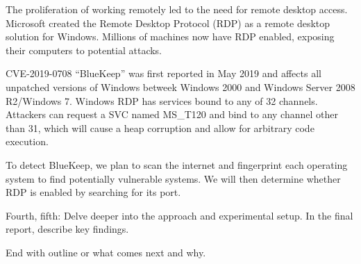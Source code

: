 The proliferation of working remotely led to the need for remote desktop
access. Microsoft created the Remote Desktop Protocol (RDP) as a remote
desktop solution for Windows. Millions of machines now have RDP 
enabled, exposing their computers to potential attacks.

CVE-2019-0708 ``BlueKeep'' was first reported in May 2019 and affects
all unpatched versions of Windows betweek Windows 2000 and Windows 
Server 2008 R2/Windows 7. Windows RDP has services bound to any of 
32 channels. Attackers can request a SVC named MS\_T120 and bind to
any channel other than 31, which will cause a  heap corruption and allow
for arbitrary code execution.

To detect BlueKeep, we plan to scan the internet and fingerprint each 
operating system to find potentially vulnerable systems. We will then
determine whether RDP is enabled by searching for its port.

Fourth, fifth: Delve deeper into the approach and experimental setup. 
In the final report, describe key findings.

End with outline or what comes next and why. 
